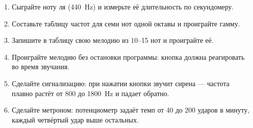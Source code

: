 \begin{tasks}
\begin{enumerate}
\item {} Сыграйте ноту ля (\SI{440}{Hz}) и измерьте её длительность по секундомеру.
\item {} Составьте таблицу частот для семи нот одной октавы и проиграйте гамму.
\item {} Запишите в таблицу свою мелодию из 10--15 нот и проиграйте её.
\item {} Проиграйте мелодию без остановки программы: кнопка должна реагировать во время звучания.
\item {} Сделайте сигнализацию: при нажатии кнопки звучит сирена --- частота плавно растёт от 800 до \SI{1800}{Hz} и падает обратно.
\item {} Сделайте метроном: потенциометр задаёт темп от 40 до 200 ударов в минуту, каждый четвёртый удар выше остальных.
\end{enumerate}
\end{tasks}
